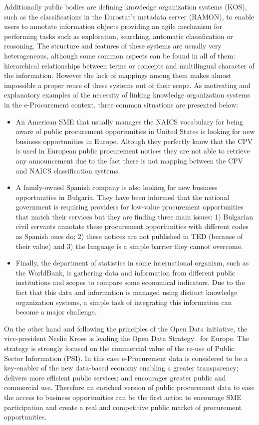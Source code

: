 Additionally public bodies are defining knowledge organization systems (KOS), such as the classifications in the Eurostat's metadata server (RAMON), 
to enable users to annotate information objects providing an agile mechanism for performing tasks such as exploration, searching, 
automatic classification or reasoning. The structure and features of these systems are usually very heterogeneous, 
although some common aspects can be found in all of them: hierarchical relationships between terms or concepts and multilingual character of the information. 
However the lack of mappings among them makes almost impossible a proper reuse of these systems out of their scope. As motivating and 
explanatory examples of the necessity of linking knowledge organization systems in the e-Procurement context, 
three common situations are presented below:

\begin{itemize}
 \item An American SME that usually manages the NAICS vocabulary for being aware of public procurement 
opportunities in United States is looking for new business opportunities in Europe. Altough they perfectly 
know that the CPV is used in European public procurement notices they are not able to retrieve 
any announcement due to the fact there is not mapping between the CPV and NAICS classification systems.
\item A family-owned Spanish company is also looking for new business opportunities in Bulgaria. They have been informed 
that the national government is requiring providers for low-value procurement opportunities that match their services but they 
are finding three main issues: 1) Bulgarian civil servants annotate these procurement opportunities with different codes as Spanish ones do; 2) 
these notices are not published in TED (because of their value) and 3) the language is a simple barrier they cannot overcome.
\item Finally, the department of statistics in some international organism, such as the WorldBank, is gathering data and information 
from different public institutions and scopes to compare some economical indicators. Due to the fact that this data and information is managed 
using distinct knowledge organization systems, a simple task of integrating this information can become a major challenge.
\end{itemize}

On the other hand and following the principles of the Open Data initiative, the vice-president Neelie Kroes is 
leading the Open Data Strategy~\cite{d2003} for Europe. The strategy is strongly focused on the commercial 
value of the re-use of Public Sector Information (PSI). In this case e-Procurement data is considered to be 
a key-enabler of the new data-based economy enabling a greater transparency; delivers more efficient public services; and encourages 
greater public and commercial use. Therefore an enriched version of public procurement data to ease the access 
to business opportunities can be the first action to encourage SME participation and create a real and competitive 
public market of procurement opportunities. 


